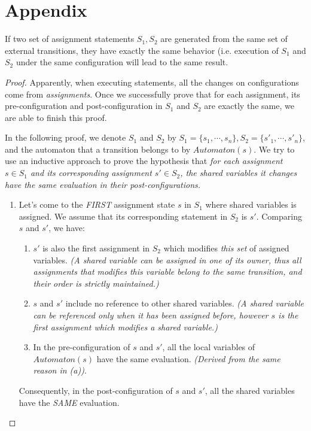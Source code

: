 \section*{Appendix}

\setcounter{theorem}{0}
\begin{theorem} If two set of assignment statements $S_1, S_2$ are generated from the same set of external transitions, they have exactly the same behavior (i.e. execution of $S_1$ and $S_2$ under the same configuration will lead to the same result.
\end{theorem}
\begin{proof}
    Apparently, when executing statements, all the changes on configurations come from \emph{assignments}. Once we successfully prove that for each assignment, its pre-configuration and post-configuration in $S_1$ and $S_2$ are exactly the same, we are able to finish this proof.
    
    In the following proof, we denote $S_1$ and $S_2$ by $S_1=\{s_1,\cdots,s_n\},S_2=\{s'_1,\cdots,s'_n\}$, and the automaton that a transition belongs to by $Automaton(s)$. We try to use an inductive approach to prove the hypothesis that \emph{for each assignment $s\in S_1$ and its corresponding assignment $s'\in S_2$, the shared variables it changes have the same evaluation in their post-configurations.}
    \begin{enumerate}
        \item Let's come to the \emph{FIRST} assignment state $s$ in $S_1$ where shared variables is assigned. We assume that its corresponding statement in $S_2$ is $s'$. Comparing $s$ and $s'$, we have:
        \begin{enumerate}
            \item $s'$ is also the first assignment in $S_2$ which modifies \emph{this set} of assigned variables.
            \emph{(A shared variable can be assigned in one of its owner, thus all assignments that modifies this variable belong to the same transition, and their order is strictly maintained.)}
            \item $s$ and $s'$ include no reference to other shared variables. \emph{(A shared variable can be referenced only when it has been assigned before, however $s$ is the first assignment which modifies a shared variable.)}
            \item In the pre-configuration of $s$ and $s'$, all the local variables of $Automaton(s)$ have the same evaluation. \emph{(Derived from the same reason in (a))}.
        \end{enumerate}
        Consequently, in the post-configuration of $s$ and $s'$, all the shared variables have the \emph{SAME} evaluation.


\end{enumerate}
\end{proof}
